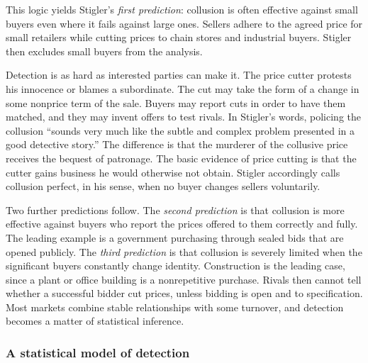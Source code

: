 This logic yields Stigler's \emph{first prediction}: collusion is often effective against small buyers even where it
fails against large ones. Sellers adhere to the agreed price for small retailers while cutting prices to chain
stores and industrial buyers. Stigler then excludes small buyers from the analysis.

Detection is as hard as interested parties can make it. The price cutter protests his innocence or blames a
subordinate. The cut may take the form of a change in some nonprice term of the sale. Buyers may report cuts in
order to have them matched, and they may invent offers to test rivals. In Stigler's words, policing the collusion
``sounds very much like the subtle and complex problem presented in a good detective story.'' The difference is
that the murderer of the collusive price receives the bequest of patronage. The basic evidence of price cutting is
that the cutter gains business he would otherwise not obtain. Stigler accordingly calls collusion perfect, in his
sense, when no buyer changes sellers voluntarily.

Two further predictions follow. The \emph{second prediction} is that collusion is more effective against buyers who
report the prices offered to them correctly and fully. The leading example is a government purchasing through
sealed bids that are opened publicly. The \emph{third prediction} is that collusion is severely limited when the
significant buyers constantly change identity. Construction is the leading case, since a plant or office building is
a nonrepetitive purchase. Rivals then cannot tell whether a successful bidder cut prices, unless bidding is open and
to specification. Most markets combine stable relationships with some turnover, and detection becomes a matter of
statistical inference.

\subsubsection{A statistical model of detection}

